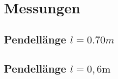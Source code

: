 \section{Messungen}


\subsection{Pendellänge $l = 0.70 m$}
\begin{minipage}{\textwidth}

 \hfill

\end{minipage}


\begin{minipage}{\textwidth}

 \hfill

\end{minipage}

\begin{minipage}{\textwidth}

 \hfill

\end{minipage}


\subsection{Pendellänge $l = 0,6 \si{\meter} $}
\begin{minipage}{\textwidth}

 \hfill

\end{minipage}


\begin{minipage}{\textwidth}

 \hfill

\end{minipage}

\begin{minipage}{\textwidth}

 \hfill

\end{minipage}
